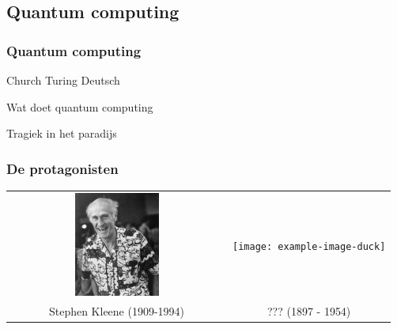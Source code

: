 \documentclass{beamer}
\begin{document}
\subsection{Quantum computing}
\begin{frame}
    \frametitle{Quantum computing}

    Church Turing Deutsch

    Wat doet quantum computing
\end{frame}

\begin{frame}
    \begin{center}
        {\LARGE Tragiek in het paradijs}
    \end{center}
\end{frame}


\begin{frame}
    \frametitle{De protagonisten}
    \begin{tabular*}{\textwidth}{c c}
        \includegraphics[width=0.4\textwidth]{Kleene.jpeg} & \texttt{[image: example-image-duck]} \\
        {\large Stephen Kleene} (1909-1994) & {\large ???} (1897 - 1954)\\
    \end{tabular*}
\end{frame}
\end{document}
